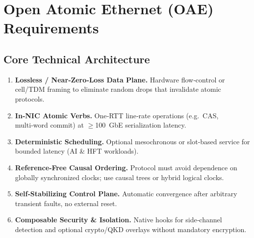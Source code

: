 \documentclass[../../../OAE-SPEC-MAIN.tex]{subfiles}
\begin{document}
\section{Open Atomic Ethernet (OAE) Requirements}


%

\subsection{Core Technical Architecture}
\begin{enumerate}
\item \textbf{Lossless / Near‑Zero‑Loss Data Plane.} Hardware flow‑control or cell/TDM framing to eliminate random drops that invalidate atomic protocols.
\item \textbf{In‑NIC Atomic Verbs.} One‑RTT line‑rate operations (e.g.\ CAS, multi‑word commit) at $\ge$100 GbE serialization latency.
\item \textbf{Deterministic Scheduling.} Optional mesochronous or slot‑based service for bounded latency (AI \& HFT workloads).
\item \textbf{Reference‑Free Causal Ordering.} Protocol must avoid dependence on globally synchronized clocks; use causal trees or hybrid logical clocks.
\item \textbf{Self‑Stabilizing Control Plane.} Automatic convergence after arbitrary transient faults, no external reset.
\item \textbf{Composable Security \& Isolation.} Native hooks for side‑channel detection and optional crypto/QKD overlays without mandatory encryption.
\end{enumerate}
\end{document}
